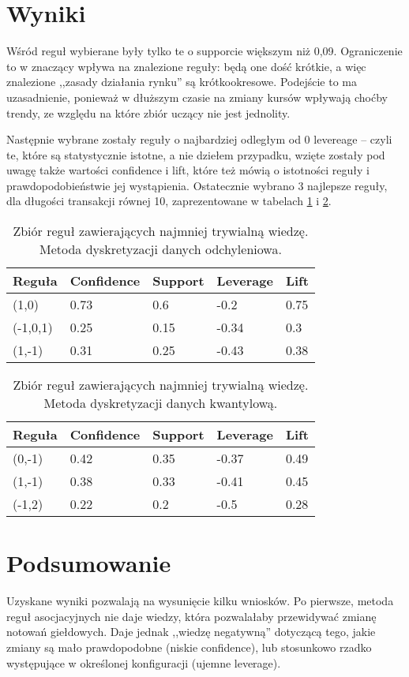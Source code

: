 \documentclass[a4paper,10pt]{article}
\begin{document}
\section{Wyniki}
Wśród reguł wybierane były tylko te o supporcie większym niż 0,09. Ograniczenie to w znaczący wpływa na znalezione reguły: będą one dość krótkie, 
a więc znalezione ,,zasady działania rynku'' są krótkookresowe. Podejście to ma uzasadnienie, ponieważ w dłuższym czasie na zmiany kursów wpływają 
choćby trendy, ze względu na które zbiór uczący nie jest jednolity.

Następnie wybrane zostały reguły o najbardziej odległym od 0 levereage – czyli te, które są statystycznie istotne, a nie dziełem przypadku, 
wzięte zostały pod uwagę także wartości confidence i lift, które też mówią o istotności reguły i prawdopodobieństwie jej wystąpienia. 
Ostatecznie wybrano 3 najlepsze reguły, dla długości transakcji równej 10, zaprezentowane w tabelach \ref{tab:k1} i \ref{tab:k2}.

\begin{center}
\begin{table}
\centering
\caption{Zbiór reguł zawierających najmniej trywialną wiedzę. Metoda dyskretyzacji danych odchyleniowa.}
\begin{tabular}{|l|l|l|l|l|} 
\hline
\bf{Reguła} & \bf{Confidence} & \bf{Support} & \bf{Leverage} & \bf{Lift} \\ \hline
(1,0) & 0.73 & 0.6 & -0.2 & 0.75 \\ \hline
(-1,0,1) & 0.25 & 0.15 & -0.34 & 0.3 \\ \hline
(1,-1) & 0.31 & 0.25 & -0.43 & 0.38 \\ \hline
\end{tabular}
\label{tab:k1}
\end{table}
\end{center}


\begin{center}
\begin{table}
\centering
\caption{Zbiór reguł zawierających najmniej trywialną wiedzę. Metoda dyskretyzacji danych kwantylową.}
\begin{tabular}{|l|l|l|l|l|} 
\hline
\bf{Reguła} & \bf{Confidence} & \bf{Support} & \bf{Leverage} & \bf{Lift} \\ \hline
(0,-1) & 0.42 & 0.35 & -0.37 & 0.49  \\ \hline
(1,-1) & 0.38 & 0.33 & -0.41 & 0.45 \\ \hline
(-1,2) & 0.22 & 0.2 & -0.5 & 0.28 \\ \hline
\end{tabular}
\label{tab:k2}
\end{table}
\end{center}

\section{Podsumowanie}

Uzyskane wyniki pozwalają na wysunięcie kilku wniosków. Po pierwsze, metoda reguł asocjacyjnych nie daje wiedzy, która pozwalałaby przewidywać zmianę notowań
giełdowych. Daje jednak ,,wiedzę negatywną'' dotyczącą tego, jakie zmiany są mało prawdopodobne (niskie confidence), lub stosunkowo rzadko występujące w określonej
 konfiguracji (ujemne leverage).
\end{document}
